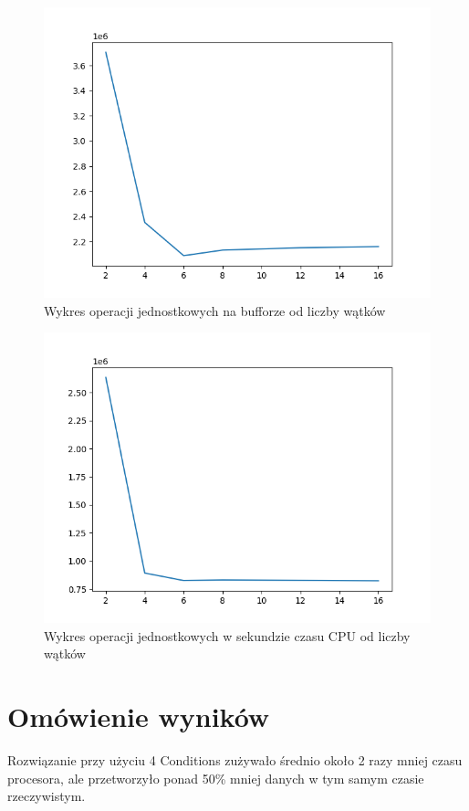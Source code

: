 \documentclass[12pt,a4paper,table]{article}
\begin{document}
    \begin{figure}[H]
        \centering
        \includegraphics[width=0.6\linewidth]{img/lock_count.png}
        \caption{Wykres operacji jednostkowych na bufforze od liczby wątków}
        \label{fig:lock_count}
    \end{figure}

    \begin{figure}[H]
        \centering
        \includegraphics[width=0.6\linewidth]{img/lock_count_per_cpu.png}
        \caption{Wykres operacji jednostkowych w sekundzie czasu CPU od liczby wątków}
        \label{fig:lock_count_per_cpu}
    \end{figure}

    \section{Omówienie wyników}
    Rozwiązanie przy użyciu 4 Conditions zużywało średnio około 2 razy
    mniej czasu procesora, ale przetworzyło ponad 50\% mniej 
    danych w tym samym czasie rzeczywistym.
\end{document}
